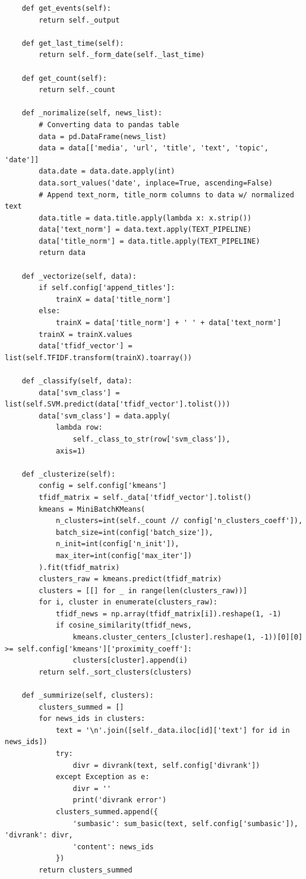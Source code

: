 \documentclass[a4paper, 14pt]{extarticle}
\begin{document}
\begin{verbatim}
    def get_events(self):
        return self._output

    def get_last_time(self):
        return self._form_date(self._last_time)

    def get_count(self):
        return self._count

    def _norimalize(self, news_list):
        # Converting data to pandas table
        data = pd.DataFrame(news_list)
        data = data[['media', 'url', 'title', 'text', 'topic', 'date']]
        data.date = data.date.apply(int)
        data.sort_values('date', inplace=True, ascending=False)
        # Append text_norm, title_norm columns to data w/ normalized text
        data.title = data.title.apply(lambda x: x.strip())
        data['text_norm'] = data.text.apply(TEXT_PIPELINE)
        data['title_norm'] = data.title.apply(TEXT_PIPELINE)
        return data

    def _vectorize(self, data):
        if self.config['append_titles']:
            trainX = data['title_norm']
        else:
            trainX = data['title_norm'] + ' ' + data['text_norm']
        trainX = trainX.values
        data['tfidf_vector'] = list(self.TFIDF.transform(trainX).toarray())

    def _classify(self, data):
        data['svm_class'] = list(self.SVM.predict(data['tfidf_vector'].tolist()))
        data['svm_class'] = data.apply(
            lambda row:
                self._class_to_str(row['svm_class']),
            axis=1)

    def _clusterize(self):
        config = self.config['kmeans']
        tfidf_matrix = self._data['tfidf_vector'].tolist()
        kmeans = MiniBatchKMeans(
            n_clusters=int(self._count // config['n_clusters_coeff']),
            batch_size=int(config['batch_size']),
            n_init=int(config['n_init']),
            max_iter=int(config['max_iter'])
        ).fit(tfidf_matrix)
        clusters_raw = kmeans.predict(tfidf_matrix)
        clusters = [[] for _ in range(len(clusters_raw))]
        for i, cluster in enumerate(clusters_raw):
            tfidf_news = np.array(tfidf_matrix[i]).reshape(1, -1)
            if cosine_similarity(tfidf_news,
                kmeans.cluster_centers_[cluster].reshape(1, -1))[0][0] >= self.config['kmeans']['proximity_coeff']:
                clusters[cluster].append(i)
        return self._sort_clusters(clusters)

    def _summirize(self, clusters):
        clusters_summed = []
        for news_ids in clusters:
            text = '\n'.join([self._data.iloc[id]['text'] for id in news_ids])
            try:
                divr = divrank(text, self.config['divrank'])
            except Exception as e:
                divr = ''
                print('divrank error')
            clusters_summed.append({
                'sumbasic': sum_basic(text, self.config['sumbasic']), 'divrank': divr,
                'content': news_ids
            })
        return clusters_summed


\end{verbatim}
\end{document}
